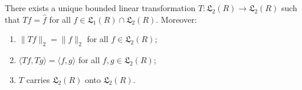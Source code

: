 There exists a unique bounded linear transformation $T: \mathfrak{L}_2(R) \to \mathfrak{L}_2(R)$ such that $Tf = \hat{f}$ for all $f \in \mathfrak{L}_1(R) \cap \mathfrak{L}_2(R)$. Moreover:
\begin{enumerate}
\item[(i)] $\|Tf\|_2 = \|f\|_2$ for all $f \in \mathfrak{L}_2(R)$;
\item[(ii)] $\langle Tf, Tg \rangle = \langle f, g \rangle$ for all $f, g \in \mathfrak{L}_2(R)$;
\item[(iii)] $T$ carries $\mathfrak{L}_2(R)$ onto $\mathfrak{L}_2(R)$.
\end{enumerate}
